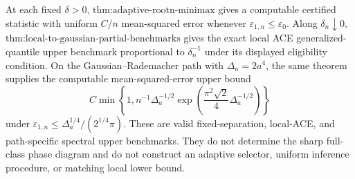 At each fixed \(\delta>0\), \(\text{thm:adaptive-rootn-minimax}\) gives a computable certified statistic with uniform \(C/n\) mean-squared error whenever \(\varepsilon_{1,n}\le\varepsilon_0\). Along \(\delta_n\downarrow0\), \(\text{thm:local-to-gaussian-partial-benchmarks}\) gives the exact local ACE generalized-quantile upper benchmark proportional to \(\delta_n^{-1}\) under its displayed eligibility condition. On the Gaussian--Rademacher path with \(\Delta_a=2a^4\), the same theorem supplies the computable mean-squared-error upper bound
\[
 C\min\!\left\{1,n^{-1}\Delta_a^{-1/2}
 \exp\!\left(\frac{\pi^2\sqrt2}{4}\Delta_a^{-1/2}\right)\right\}
\]
under \(\varepsilon_{1,n}\le\Delta_a^{1/4}/(2^{1/4}\pi)\). These are valid fixed-separation, local-ACE, and path-specific spectral upper benchmarks. They do not determine the sharp full-class phase diagram and do not construct an adaptive selector, uniform inference procedure, or matching local lower bound.